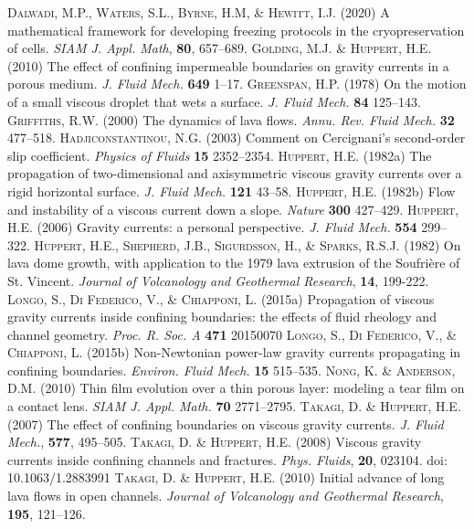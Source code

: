 \documentclass[11pt]{article}
\begin{document}
\newpage
\begin{thebibliography}{99}
%
\textsc{Dalwadi, M.P., Waters, S.L., Byrne, H.M, \& Hewitt, I.J.} (2020)
A mathematical framework for developing freezing protocols in the cryopreservation of cells.
{\it SIAM J. Appl. Math}, {\bf 80}, 657--689.
%
\textsc{Golding, M.J. \& Huppert, H.E.} (2010)
The effect of confining impermeable boundaries on gravity currents in a porous medium.
{\it J. Fluid Mech.} {\bf 649} 1--17.
%
\textsc{Greenspan, H.P.} (1978)
On the motion of a small viscous droplet that wets a surface. 
{\it J. Fluid Mech.} {\bf 84} 125--143.
%
\textsc{Griffiths, R.W.} (2000)
The dynamics of lava flows.
{\it Annu. Rev. Fluid Mech.} {\bf 32} 477--518.
%
\textsc{Hadjiconstantinou, N.G.} (2003)
Comment on Cercignani's second-order slip coefficient.
{\it Physics of Fluids} {\bf 15} 2352--2354.
%
\textsc{Huppert, H.E.} (1982a)
The propagation of two-dimensional and axisymmetric viscous gravity currents over a rigid horizontal surface.
{\it J. Fluid Mech.} {\bf 121} 43--58.
%
\textsc{Huppert, H.E.} (1982b)
Flow and instability of a viscous current down a slope.
{\it Nature} {\bf 300} 427--429.
%
\textsc{Huppert, H.E.} (2006)
Gravity currents: a personal perspective.
{\it J. Fluid Mech.} {\bf 554} 299--322.
%
\textsc{Huppert, H.E., Shepherd, J.B., Sigurdsson, H., \& Sparks, R.S.J.} (1982)
On lava dome growth, with application to the 1979 lava extrusion of the Soufri\`{e}re of St. Vincent.
{\it Journal of Volcanology and Geothermal Research}, {\bf 14}, 199-222.
%
\textsc{Longo, S., Di Federico, V., \& Chiapponi, L.} (2015a)
Propagation of viscous gravity currents inside confining boundaries: the effects of fluid rheology and channel geometry.
{\it Proc. R. Soc. A} {\bf 471} 20150070
%
\textsc{Longo, S., Di Federico, V., \& Chiapponi, L.} (2015b)
Non-Newtonian power-law gravity currents propagating in confining boundaries.
{\it Environ. Fluid Mech.} {\bf 15} 515--535.
%
\textsc{Nong, K. \& Anderson, D.M.} (2010)
Thin film evolution over a thin porous layer: modeling a tear film on a contact lens.
{\it SIAM J. Appl. Math.} {\bf 70} 2771--2795.
%
\textsc{Takagi, D. \& Huppert, H.E.} (2007)
The effect of confining boundaries on viscous gravity currents.
{\it J. Fluid Mech.}, {\bf 577}, 495--505.
%
\textsc{Takagi, D. \& Huppert, H.E.} (2008)
Viscous gravity currents inside confining channels and fractures.
{\it Phys. Fluids}, {\bf 20}, 023104.
doi: 10.1063/1.2883991
%
\textsc{Takagi, D. \& Huppert, H.E.} (2010)
Initial advance of long lava flows in open channels.
{\it Journal of Volcanology and Geothermal Research}, {\bf 195}, 121--126.
%


\end{thebibliography}
\end{document}
